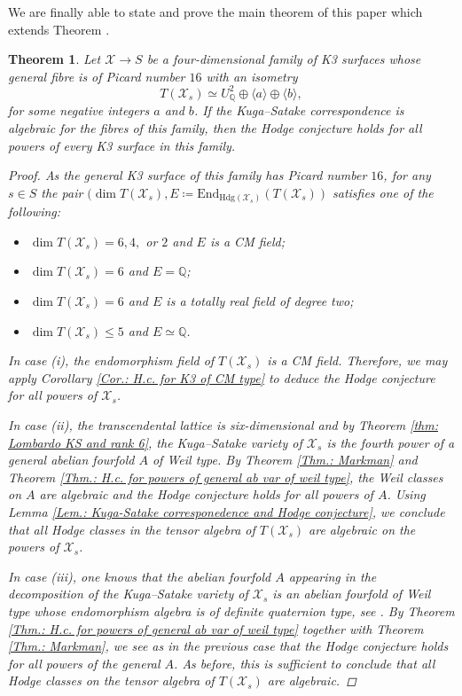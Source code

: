 \documentclass[11pt,twoside,a4paper]{amsart}
\newcommand{\0}{\mathscr{O}}
\newcommand{\Q}{\mathbb{Q}}
\newcommand{\X}{\mathscr{X}}
\theoremstyle{plain}
\newtheorem{thm}{Theorem}[section]
\theoremstyle{definition}
\theoremstyle{remark}
\begin{document}
We are finally able to state and prove the main theorem of this paper which extends Theorem \cite[Thm.\ 2]{schlickewei2010hodge}.
\begin{thm}
\label{main thm}
Let $\mathscr{X}\rightarrow S$ be a four-dimensional family of K3 surfaces whose general fibre is of Picard number $16$ with an isometry
\[
T(\mathscr{X}_s)\simeq U_\Q^2\oplus \langle a\rangle\oplus\langle b\rangle,
\]
for some negative integers $a$ and $b$. If the Kuga--Satake correspondence is algebraic for the fibres of this family, then the Hodge conjecture holds for all powers of every K3 surface in this family.
\begin{proof}
As the general K3 surface of this family has Picard number $16$, for any $s\in S$ the pair $(\dim T(\X_s),E\coloneqq \mathrm{End}_{\mathrm{Hdg}(\X_s)}(T(\X_s))$ satisfies one of the following:
\begin{itemize}
    \item[(i)] $\dim T(\X_s)=6, 4,$ or $2$ and $E$ is a CM field;
    \item[(ii)] $\dim T(\X_s)=6$ and $E=\Q$;
    \item[(iii)] $\dim T(\X_s)=6$ and $E$ is a totally real field of degree two;
    \item[(iv)] $\dim T(\X_s)\leq 5$ and $E\simeq \Q$.
\end{itemize}

In case (i), the endomorphism field of $T(\X_s)$ is a CM field. Therefore, we may apply Corollary \ref{Cor.: H.c. for K3 of CM type} to deduce the Hodge conjecture for all powers of $\X_s$.

\smallskip

In case (ii), the transcendental lattice is six-dimensional and by Theorem \ref{thm: Lombardo KS and rank 6}, the Kuga--Satake variety of $\X_s$ is the fourth power of a general abelian fourfold $A$ of Weil type. By Theorem \ref{Thm.: Markman} and Theorem \ref{Thm.: H.c. for powers of general ab var of weil type}, the Weil classes on $A$ are algebraic and the Hodge conjecture holds for all powers of $A$. Using Lemma \ref{Lem.: Kuga-Satake corresponedence and Hodge conjecture}, we conclude that all Hodge classes in the tensor algebra of $T(\X_s)$ are algebraic on the powers of $\X_s$.

\smallskip

In case (iii), one knows that the abelian fourfold $A$ appearing in the decomposition of the Kuga--Satake variety of $\X_s$ is an abelian fourfold of Weil type whose endomorphism algebra is of definite quaternion type, see \cite[Prop.\ 5.7]{van2000kuga}. By Theorem \ref{Thm.: H.c. for powers of general ab var of weil type} together with Theorem \ref{Thm.: Markman}, we see as in the previous case that the Hodge conjecture holds for all powers of the general $A$. As before, this is sufficient to conclude that all Hodge classes on the tensor algebra of $T(\X_s)$ are algebraic.


\end{proof}
\end{thm}
\end{document}
